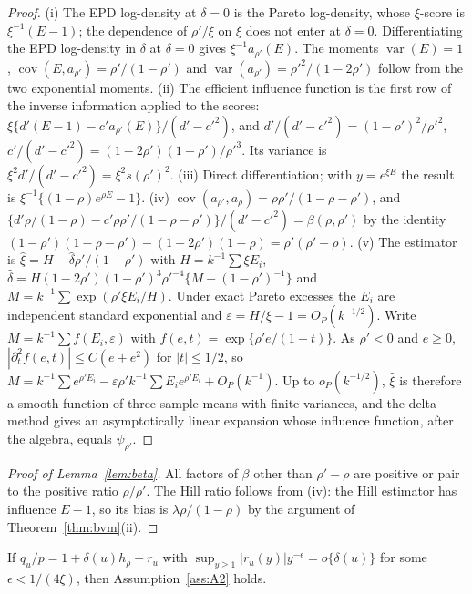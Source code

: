 \begin{proof}
(i) The EPD log-density at $\delta=0$ is the Pareto log-density, whose $\xi$-score is
$\xi^{-1}(E-1)$; the dependence of $\rho'/\xi$ on $\xi$ does not enter at $\delta=0$.
Differentiating the EPD log-density in $\delta$ at $\delta=0$ gives $\xi^{-1}a_{\rho'}(E)$.
The moments $\operatorname{var}(E)=1$, $\operatorname{cov}(E,a_{\rho'})=\rho'/(1-\rho')$ and
$\operatorname{var}(a_{\rho'})=\rho'^2/(1-2\rho')$ follow from the two exponential moments.
(ii) The efficient influence function is the first row of the inverse information applied to
the scores: $\xi\{d'(E-1)-c'a_{\rho'}(E)\}/(d'-c'^2)$, and
$d'/(d'-c'^2)=(1-\rho')^2/\rho'^2$, $c'/(d'-c'^2)=(1-2\rho')(1-\rho')/\rho'^3$. Its variance is
$\xi^2d'/(d'-c'^2)=\xi^2s(\rho')^2$.
(iii) Direct differentiation; with $y=e^{\xi E}$ the result is $\xi^{-1}\{(1-\rho)e^{\rho E}-1\}$.
(iv) $\operatorname{cov}(a_{\rho'},a_\rho)=\rho\rho'/(1-\rho-\rho')$, and
$\{d'\rho/(1-\rho)-c'\rho\rho'/(1-\rho-\rho')\}/(d'-c'^2)=\beta(\rho,\rho')$ by the identity
$(1-\rho')(1-\rho-\rho')-(1-2\rho')(1-\rho)=\rho'(\rho'-\rho)$.
(v) The estimator is $\hat\xi=H-\hat\delta\rho'/(1-\rho')$ with $H=k^{-1}\sum\xi E_i$,
$\hat\delta=H(1-2\rho')(1-\rho')^3\rho'^{-4}\{M-(1-\rho')^{-1}\}$ and
$M=k^{-1}\sum\exp(\rho'\xi E_i/H)$. Under exact Pareto excesses the $E_i$ are independent
standard exponential and $\varepsilon=H/\xi-1=O_P(k^{-1/2})$. Write
$M=k^{-1}\sum f(E_i,\varepsilon)$ with $f(e,t)=\exp\{\rho'e/(1+t)\}$. As $\rho'<0$ and $e\ge0$,
$|\partial_t^2f(e,t)|\le C(e+e^2)$ for $|t|\le1/2$, so
$M=k^{-1}\sum e^{\rho'E_i}-\varepsilon\rho'k^{-1}\sum E_ie^{\rho'E_i}+O_P(k^{-1})$.
Up to $o_P(k^{-1/2})$, $\hat\xi$ is therefore a smooth function of three sample means with finite
variances, and the delta method gives an asymptotically linear expansion whose
influence function, after the algebra, equals $\psi_{\rho'}$. \qedhere
\end{proof}

\begin{proof}[Proof of Lemma~\ref{lem:beta}]
All factors of $\beta$ other than $\rho'-\rho$ are positive or pair to the positive ratio
$\rho/\rho'$. The Hill ratio follows from (iv): the Hill estimator has influence $E-1$, so its
bias is $\lambda\rho/(1-\rho)$ by the argument of Theorem~\ref{thm:bvm}(ii). \qedhere
\end{proof}

\begin{lemma}\label{lem:suff}
If $q_u/p=1+\delta(u)h_\rho+r_u$ with $\sup_{y\ge1}|r_u(y)|y^{-\epsilon}=o\{\delta(u)\}$ for some
$\epsilon<1/(4\xi)$, then Assumption~\ref{ass:A2} holds.
\end{lemma}

